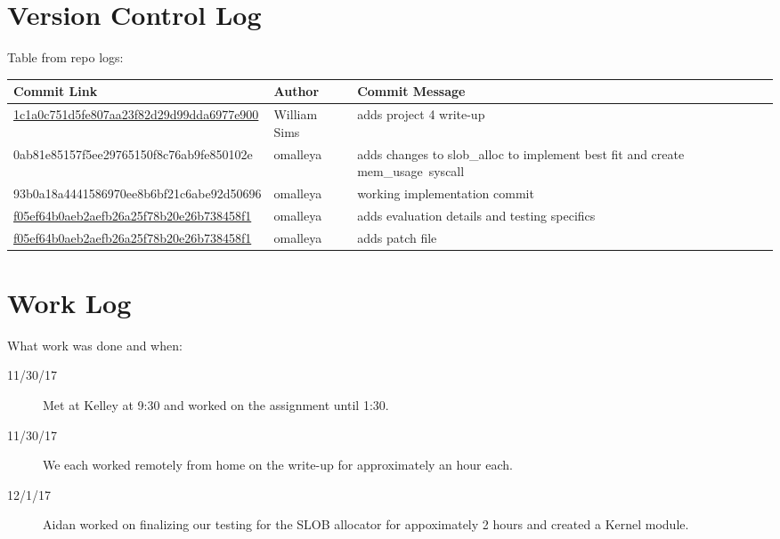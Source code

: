 \documentclass[10pt,letterpaper,draftclsnofoot,onecolumn]{IEEEtran}
\begin{document}
\section{Version Control Log}
\noindent Table from repo logs:

\begin{center}
    \begin{tabular}{ | p{8cm} | p{3cm} | p{6cm} |}
    \hline
    Commit Link & Author & Commit Message \\ \hline
    \href{https://github.com/omalleya/cs444-concurrency-writeups/commit/1c1a0c751d5fe807aa23f82d29d99dda6977e900}{1c1a0c751d5fe807aa23f82d29d99dda6977e900} & William Sims & adds project 4 write-up \\ \hline
    0ab81e85157f5ee29765150f8c76ab9fe850102e & omalleya & adds changes to slob\_alloc to implement best fit and create mem\_usage\ syscall \\ \hline
    93b0a18a4441586970ee8b6bf21c6abe92d50696 & omalleya & working implementation commit \\ \hline
    \href{https://github.com/omalleya/cs444-concurrency-writeups/commit/f05ef64b0aeb2aefb26a25f78b20e26b738458f1}{f05ef64b0aeb2aefb26a25f78b20e26b738458f1} & omalleya & adds evaluation details and testing specifics \\ \hline
    \href{https://github.com/omalleya/cs444-concurrency-writeups/commit/f05ef64b0aeb2aefb26a25f78b20e26b738458f1}{f05ef64b0aeb2aefb26a25f78b20e26b738458f1} & omalleya & adds patch file \\ \hline
    
    \end{tabular}
\end{center}

\section{Work Log}
\noindent What work was done and when:
\begin{description}
\item [11/30/17] Met at Kelley at 9:30 and worked on the assignment until 1:30.
\item [11/30/17] We each worked remotely from home on the write-up for approximately an hour each.
\item [12/1/17] Aidan worked on finalizing our testing for the SLOB allocator for appoximately 2 hours and created a Kernel module. 

\end{description}
\end{document}
